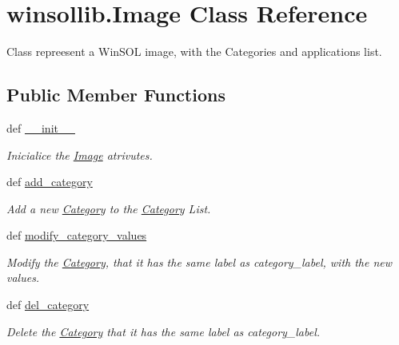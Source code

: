 \hypertarget{classwinsollib_1_1Image}{
\section{winsollib.Image Class Reference}
\label{classwinsollib_1_1Image}
}
Class repreesent a Win\-SOL image, with the Categories and applications list.  


\subsection*{Public Member Functions}
\begin{CompactItemize}
\item 
def \hyperlink{classwinsollib_1_1Image_7731ccc6d05f839e203fa017e4433845}{\_\-\_\-init\_\-\_\-}
\begin{CompactList}\small\item\em Inicialice the \hyperlink{classwinsollib_1_1Image}{Image} atrivutes. \item\end{CompactList}\item 
def \hyperlink{classwinsollib_1_1Image_7c2ae4e3733ff7816663c7c641275a47}{add\_\-category}
\begin{CompactList}\small\item\em Add a new \hyperlink{classwinsollib_1_1Category}{Category} to the \hyperlink{classwinsollib_1_1Category}{Category} List. \item\end{CompactList}\item 
def \hyperlink{classwinsollib_1_1Image_8fc4339cad75e0b687bba38e2fbd2545}{modify\_\-category\_\-values}
\begin{CompactList}\small\item\em Modify the \hyperlink{classwinsollib_1_1Category}{Category}, that it has the same label as {\em category\_\-label\/}, with the new values. \item\end{CompactList}\item 
def \hyperlink{classwinsollib_1_1Image_e871e8b3446fcbcb70a768c13da40337}{del\_\-category}
\begin{CompactList}\small\item\em Delete the \hyperlink{classwinsollib_1_1Category}{Category} that it has the same label as {\em category\_\-label\/}. \item\end{CompactList}\item 

\end{CompactItemize}
